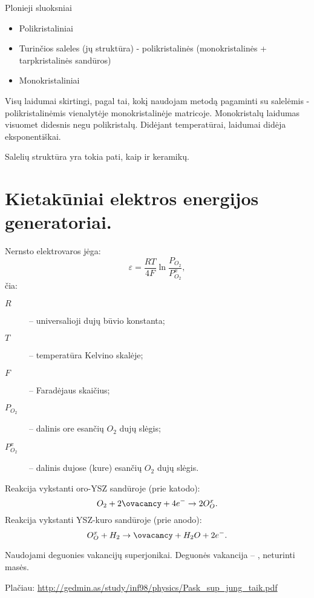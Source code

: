 Plonieji sluoksniai\begin{itemize}
  \item Polikristaliniai
  \item Turinčios saleles (jų struktūra) - polikristalinės
  (monokristalinės + tarpkristalinės sandūros)
  \item Monokristaliniai
\end{itemize}

Visų laidumai skirtingi, pagal tai, kokį naudojam metodą pagaminti su
salelėmis - polikristalinėmis vienalytėje monokristalinėje
matricoje.
Monokristalų laidumas visuomet didesnis negu polikristalų.
Didėjant temperatūrai, laidumai didėja eksponentiškai.

Salelių struktūra yra tokia pati, kaip ir keramikų.

\section{Kietakūniai elektros energijos generatoriai.}

Nernsto elektrovaros jėga:
\begin{equation*}
  \varepsilon = \frac{RT}{4F} \ln \frac{P_{O_{2}}}{P_{O_{2}}^{x}},
\end{equation*}
čia:
\begin{description}
  \item[$R$] – universalioji dujų būvio konstanta;
  \item[$T$] – temperatūra Kelvino skalėje;
  \item[$F$] – Faradėjaus skaičius;
  \item[$P_{O_{2}}$] – dalinis ore esančių $O_{2}$ dujų slėgis;
  \item[$P_{O_{2}}^{x}$] – dalinis dujose (kure) esančių $O_{2}$
    dujų slėgis.
\end{description}

Reakcija vykstanti oro-YSZ sandūroje (prie katodo):
\begin{equation*}
  O_{2} + 2\ovacancy + 4e^{-} \to 2O_{O}^{x}.
\end{equation*}
Reakcija vykstanti YSZ-kuro sandūroje (prie anodo):
\begin{equation*}
  O_{O}^{x} + H_{2} \to \ovacancy + H_{2}O + 2e^{-}.
\end{equation*}

Naudojami deguonies vakancijų superjonikai. Deguonės vakancija – ,
neturinti masės.

Plačiau: \url{http://gedmin.as/study/inf98/physics/Pask_sup_jung_taik.pdf}


